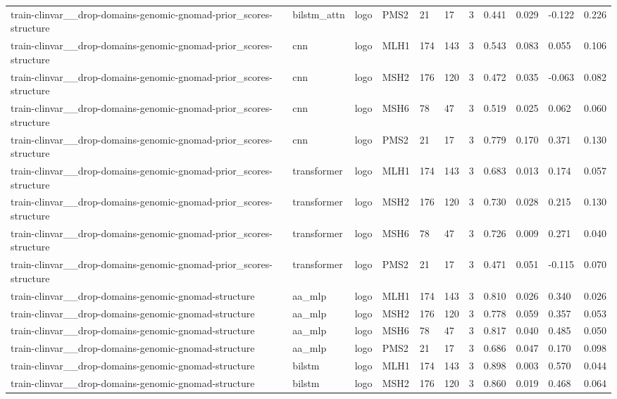 \begin{table}[t]
\begin{tabular}{lllllllllll}
train-clinvar\_\_drop-domains-genomic-gnomad-prior\_scores-structure & bilstm\_attn & logo & PMS2 & 21 & 17 & 3 & 0.441 & 0.029 & -0.122 & 0.226 \\
train-clinvar\_\_drop-domains-genomic-gnomad-prior\_scores-structure & cnn & logo & MLH1 & 174 & 143 & 3 & 0.543 & 0.083 & 0.055 & 0.106 \\
train-clinvar\_\_drop-domains-genomic-gnomad-prior\_scores-structure & cnn & logo & MSH2 & 176 & 120 & 3 & 0.472 & 0.035 & -0.063 & 0.082 \\
train-clinvar\_\_drop-domains-genomic-gnomad-prior\_scores-structure & cnn & logo & MSH6 & 78 & 47 & 3 & 0.519 & 0.025 & 0.062 & 0.060 \\
train-clinvar\_\_drop-domains-genomic-gnomad-prior\_scores-structure & cnn & logo & PMS2 & 21 & 17 & 3 & 0.779 & 0.170 & 0.371 & 0.130 \\
train-clinvar\_\_drop-domains-genomic-gnomad-prior\_scores-structure & transformer & logo & MLH1 & 174 & 143 & 3 & 0.683 & 0.013 & 0.174 & 0.057 \\
train-clinvar\_\_drop-domains-genomic-gnomad-prior\_scores-structure & transformer & logo & MSH2 & 176 & 120 & 3 & 0.730 & 0.028 & 0.215 & 0.130 \\
train-clinvar\_\_drop-domains-genomic-gnomad-prior\_scores-structure & transformer & logo & MSH6 & 78 & 47 & 3 & 0.726 & 0.009 & 0.271 & 0.040 \\
train-clinvar\_\_drop-domains-genomic-gnomad-prior\_scores-structure & transformer & logo & PMS2 & 21 & 17 & 3 & 0.471 & 0.051 & -0.115 & 0.070 \\
train-clinvar\_\_drop-domains-genomic-gnomad-structure & aa\_mlp & logo & MLH1 & 174 & 143 & 3 & 0.810 & 0.026 & 0.340 & 0.026 \\
train-clinvar\_\_drop-domains-genomic-gnomad-structure & aa\_mlp & logo & MSH2 & 176 & 120 & 3 & 0.778 & 0.059 & 0.357 & 0.053 \\
train-clinvar\_\_drop-domains-genomic-gnomad-structure & aa\_mlp & logo & MSH6 & 78 & 47 & 3 & 0.817 & 0.040 & 0.485 & 0.050 \\
train-clinvar\_\_drop-domains-genomic-gnomad-structure & aa\_mlp & logo & PMS2 & 21 & 17 & 3 & 0.686 & 0.047 & 0.170 & 0.098 \\
train-clinvar\_\_drop-domains-genomic-gnomad-structure & bilstm & logo & MLH1 & 174 & 143 & 3 & 0.898 & 0.003 & 0.570 & 0.044 \\
train-clinvar\_\_drop-domains-genomic-gnomad-structure & bilstm & logo & MSH2 & 176 & 120 & 3 & 0.860 & 0.019 & 0.468 & 0.064 \\

\end{tabular}
\end{table}
